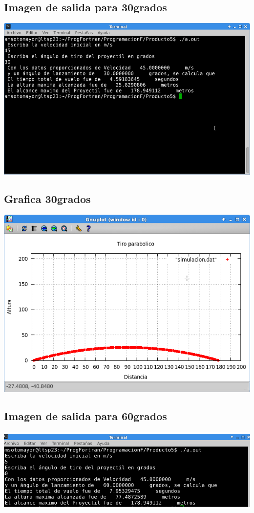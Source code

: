 \documentclass[letterpaper,10pt,twoside,onecolumn]{article}
\begin{document}
\subsection{Imagen de salida para 30grados}

\includegraphics[scale=.40]{salida30g.png}

\subsection{Grafica 30grados}

\includegraphics[scale=.50]{Grafica30g.png}

\subsection{Imagen de salida para 60grados}

\includegraphics[scale=.40]{salida60g.png}
\end{document}
